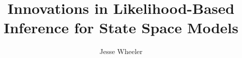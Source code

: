 \documentclass[thesis]{thesis-umich}\usepackage[]{graphicx}\usepackage[]{xcolor}
\title{Innovations in Likelihood-Based Inference for State Space Models}
\author{Jesse Wheeler}
\begin{document}






\appendix
% 




% 

\normalem

\end{document}

